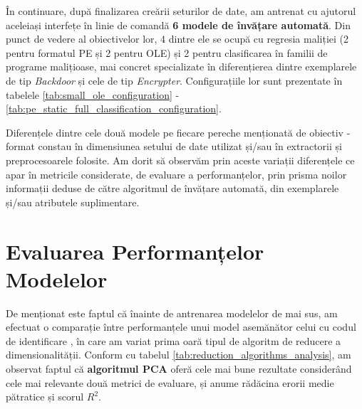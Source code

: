 \documentclass[../../main.tex]{subfiles}
\begin{document}
În continuare, după finalizarea creării seturilor de date, am antrenat cu ajutorul aceleiași interfețe în linie de comandă \textbf{6 modele de învățare automată}. Din punct de vedere al obiectivelor lor, 4 dintre ele se ocupă cu regresia maliției (2 pentru formatul PE și 2 pentru OLE) și 2 pentru clasificarea în familii de programe malițioase, mai concret specializate în diferențierea dintre exemplarele de tip \textit{Backdoor} și cele de tip \textit{Encrypter}. Configurațiile lor sunt prezentate în tabelele \ref{tab:small_ole_configuration} - \ref{tab:pe_static_full_classification_configuration}.

\vspace{0.3cm}

\vspace{0.3cm}

\vspace{0.3cm}

\newpage


\vspace{0.3cm}

\vspace{0.3cm}

\vspace{0.3cm}

Diferențele dintre cele două modele pe fiecare pereche menționată de obiectiv - format constau în dimensiunea setului de date utilizat și/sau în extractorii și preprocesoarele folosite. Am dorit să observăm prin aceste variații diferențele ce apar în metricile considerate, de evaluare a performanțelor, prin prisma noilor informații deduse de către algoritmul de învățare automată, din exemplarele și/sau atributele suplimentare.

\section{Evaluarea Performanțelor Modelelor}
\label{sec:evaluation_evaluation}

De menționat este faptul că înainte de antrenarea modelelor de mai sus, am efectuat o comparație între performanțele unui model asemănător celui cu codul de identificare , în care am variat prima oară tipul de algoritm de reducere a dimensionalității. Conform cu tabelul \ref{tab:reduction_algorithms_analysis}, am observat faptul că \textbf{algoritmul PCA} oferă cele mai bune rezultate considerând cele mai relevante două metrici de evaluare, și anume rădăcina erorii medie pătratice și scorul $ R^2 $.
\end{document}
